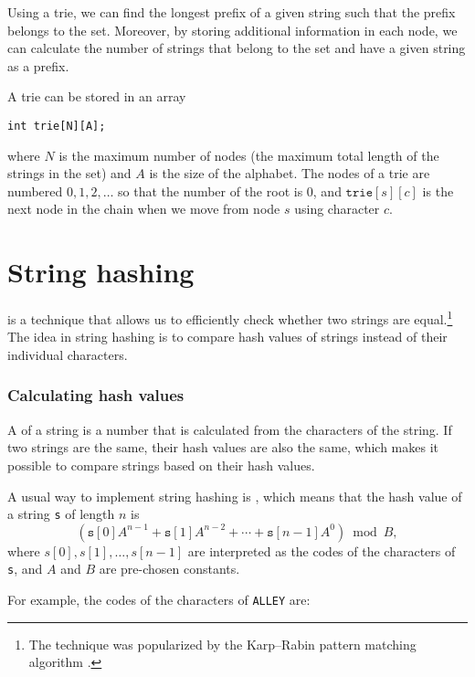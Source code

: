Using a trie, we can find
the longest prefix of a given string
such that the prefix belongs to the set.
Moreover, by storing additional information
in each node,
we can calculate the number of
strings that belong to the set and have a
given string as a prefix.

A trie can be stored in an array
\begin{lstlisting}
int trie[N][A];
\end{lstlisting}
where $N$ is the maximum number of nodes
(the maximum total length of the strings in the set)
and $A$ is the size of the alphabet.
The nodes of a trie are numbered
$0,1,2,\ldots$ so that the number of the root is 0,
and $\texttt{trie}[s][c]$ is the next node in the chain
when we move from node $s$ using character $c$.

\section{String hashing}


 is a technique that
allows us to efficiently check whether two
strings are equal.\footnote{The technique
    was popularized by the Karp–Rabin pattern matching
    algorithm \cite{kar87}.}
The idea in string hashing is to compare hash values of
strings instead of their individual characters.

\subsubsection*{Calculating hash values}


A  of a string is
a number that is calculated from the characters
of the string.
If two strings are the same,
their hash values are also the same,
which makes it possible to compare strings
based on their hash values.

A usual way to implement string hashing
is , which means
that the hash value of a string \texttt{s}
of length $n$ is
\[(\texttt{s}[0] A^{n-1} + \texttt{s}[1] A^{n-2} + \cdots + \texttt{s}[n-1] A^0) \bmod B  ,\]
where $s[0],s[1],\ldots,s[n-1]$
are interpreted as the codes of the characters of \texttt{s},
and $A$ and $B$ are pre-chosen constants.

For example, the codes of the characters
of \texttt{ALLEY} are:
\begin{center}
\end{center}

